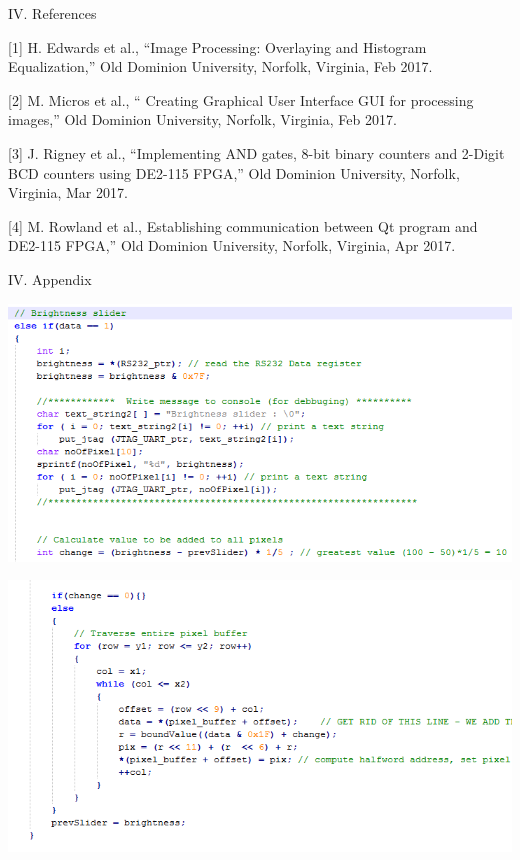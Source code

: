 \documentclass{article}
\newenvironment{Figure}
  {\par\medskip\noindent\ignorespaces\minipage{\linewidth}}
  {\endminipage\par\medskip}
\begin{document}
\begin{multicols*}{2}
\begin{center}
\large{IV. References}
\end{center}

[1]	H. Edwards et al., “Image Processing: Overlaying and Histogram Equalization,” Old Dominion University, Norfolk, Virginia, Feb 2017.

[2]     M. Micros et al., “ Creating Graphical User Interface GUI for processing images,” Old Dominion University, Norfolk, Virginia, Feb 2017.

[3]	J. Rigney et al., “Implementing AND gates, 8-bit binary counters and 2-Digit BCD counters using DE2-115 FPGA,” Old Dominion University, Norfolk, Virginia,  Mar 2017.

[4]	M. Rowland et al.,  Establishing communication between Qt program and DE2-115 FPGA,” Old Dominion University, Norfolk, Virginia, Apr 2017.


\end{multicols*}


\begin{center}
\large{IV. Appendix}
\end{center}


\begin{Figure}
 \centering
 \includegraphics[width=\linewidth]{c1.png}
\end{Figure}

\begin{Figure}
 \centering
 \includegraphics[width=\linewidth]{c2.png}
\end{Figure}
\end{document}
